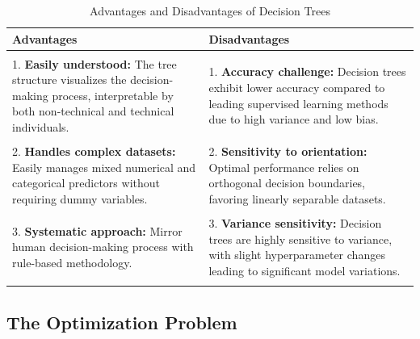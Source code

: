 \begin{table}[H]
    \centering
    \caption{Advantages and Disadvantages of Decision Trees}
    \label{tab:dt_adv}
    \begin{tabularx}{\textwidth}{X|X}
        \hline
        \textbf{Advantages}                                                                                                                                      & \textbf{Disadvantages}                                                                                                                                         \\
        \hline                                                                                                                                                                                                                                                                                                                    \\
        1. \textbf{Easily understood:} The tree structure visualizes the decision-making process, interpretable by both non-technical and technical individuals. & 1. \textbf{Accuracy challenge:} Decision trees exhibit lower accuracy compared to leading supervised learning methods due to high variance and low bias.       \\ \\
        2. \textbf{Handles complex datasets:} Easily manages mixed numerical and categorical predictors without requiring dummy variables.                       & 2. \textbf{Sensitivity to orientation:} Optimal performance relies on orthogonal decision boundaries, favoring linearly separable datasets.                    \\ \\
        3. \textbf{Systematic approach:} Mirror human decision-making process with rule-based methodology.                                                       & 3. \textbf{Variance sensitivity:} Decision trees are highly sensitive to variance, with slight hyperparameter changes leading to significant model variations. \\ \\
        \hline
    \end{tabularx}
\end{table}
\FloatBarrier

\subsection{The Optimization Problem}

